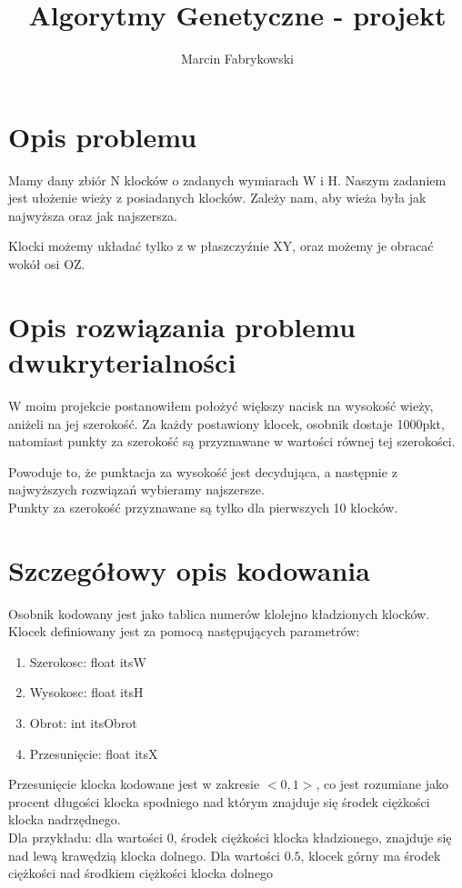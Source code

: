 \documentclass[12pt,a4paper]{article}
\title{Algorytmy Genetyczne - projekt}
\author{Marcin Fabrykowski}
\begin{document}
\maketitle
\newpage
\tableofcontents
\newpage
\section{Opis problemu}
Mamy dany zbiór N klocków o zadanych wymiarach W i H. Naszym zadaniem jest ułożenie wieży z posiadanych klocków. Zależy nam, aby wieża była jak najwyższa oraz jak najszersza.

Klocki możemy układać tylko z w płaszczyźnie XY, oraz możemy je obracać wokół osi OZ.
\section{Opis rozwiązania problemu dwukryterialności}
W moim projekcie postanowiłem położyć większy nacisk na wysokość wieży, aniżeli na jej szerokość.
Za każdy postawiony klocek, osobnik dostaje 1000pkt, natomiast punkty za szerokość są przyznawane w wartości równej tej szerokości.

Powoduje to, że punktacja za wysokość jest decydująca, a następnie z najwyższych rozwiązań wybieramy najszersze.\\
Punkty za szerokość przyznawane są tylko dla pierwszych 10 klocków.
\section{Szczegółowy opis kodowania}
Osobnik kodowany jest jako tablica numerów klolejno kładzionych klocków.\\
Klocek definiowany jest za pomocą następujących parametrów:
\begin{enumerate}
\item Szerokosc: float itsW
\item Wysokosc: float itsH
\item Obrot: int itsObrot
\item Przesunięcie: float itsX
\end{enumerate}
Przesunięcie klocka kodowane jest w zakresie $<0,1>$, co jest rozumiane jako procent długości klocka spodniego nad którym znajduje się środek ciężkości klocka nadrzędnego.\\
Dla przykładu: dla wartości $0$, środek ciężkości klocka kładzionego, znajduje się nad lewą krawędzią klocka dolnego. Dla wartości $0.5$, klocek górny ma środek ciężkości nad środkiem ciężkości klocka dolnego
\end{document}
